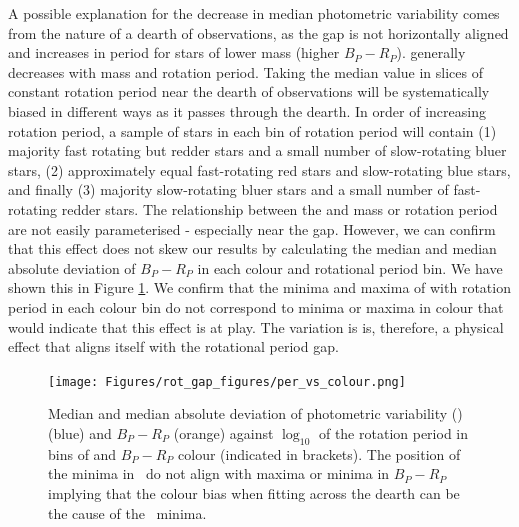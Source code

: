 A possible explanation for the decrease in median photometric variability comes from the nature of a dearth of observations, as the gap is not horizontally aligned and increases in period for stars of lower mass (higher $B_P-R_P$).
\rper{} generally decreases with mass and rotation period.
Taking the median value in slices of constant rotation period near the dearth of observations will be systematically biased in different ways as it passes through the dearth.
In order of increasing rotation period, a sample of stars in each bin of rotation period will contain (1) majority fast rotating but redder stars and a small number of slow-rotating bluer stars, (2) approximately equal fast-rotating red stars and slow-rotating blue stars, and finally (3) majority slow-rotating bluer stars and a small number of fast-rotating redder stars.
The relationship between the \rper{} and mass or rotation period are not easily parameterised - especially near the gap.
However, we can confirm that this effect does not skew our results by calculating the median and median absolute deviation of $B_P-R_P$ in each colour and rotational period bin.
We have shown this in Figure \ref{fig:colour_rper}.
We confirm that the minima and maxima of \rper{} with rotation period in each colour bin do not correspond to minima or maxima in colour that would indicate that this effect is at play.
The variation is \rper{} is, therefore, a physical effect that aligns itself with the rotational period gap.

\begin{figure}
\centering
  \texttt{[image: Figures/rot\_gap\_figures/per\_vs\_colour.png]}
  \caption{
  Median and median absolute deviation of photometric variability (\rper{}) (blue) and $B_P-R_P$ (orange) against $\log_{10}$ of the rotation period in bins of and \gaia{} $B_P-R_P$ colour (indicated in brackets). The position of the minima in \rper{} \ do not align with maxima or minima in $B_P-R_P$ implying that the colour bias when fitting across the dearth can be the cause of the \rper{} \ minima.}
  \label{fig:colour_rper}
\end{figure}

